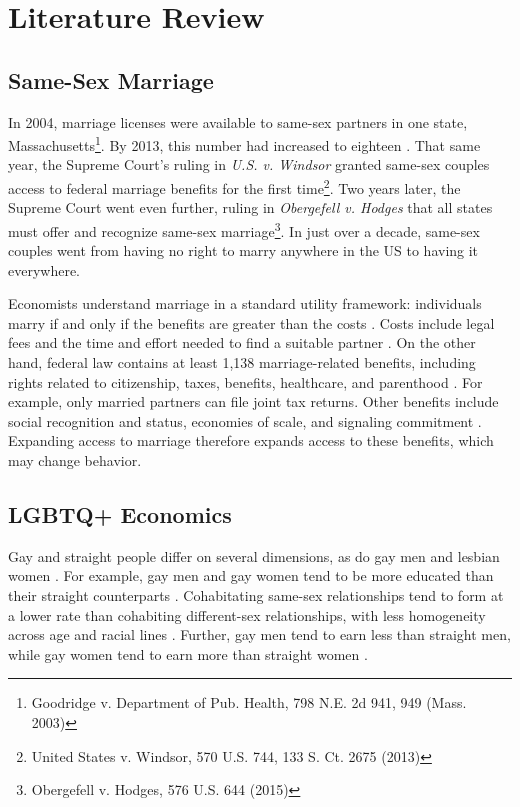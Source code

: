 \documentclass[12pt,letterpaper]{article}
\begin{document}
\section{Literature Review}
\subsection{Same-Sex Marriage}
In 2004, marriage licenses were available to same-sex partners in one state, Massachusetts\footnote{Goodridge v. Department of Pub. Health, 798 N.E. 2d 941, 949 (Mass. 2003)}. By 2013, this number had increased to eighteen \citep{27}. That same year, the Supreme Court's ruling in \textit{U.S. v. Windsor} granted same-sex couples access to federal marriage benefits for the first time\footnote{United States v. Windsor, 570 U.S. 744, 133 S. Ct. 2675 (2013)}. Two years later, the Supreme Court went even further, ruling in \textit{Obergefell v. Hodges} that all states must offer and recognize same-sex marriage\footnote{Obergefell v. Hodges, 576 U.S. 644 (2015)}. In just over a decade, same-sex couples went from having no right to marry anywhere in the US to having it everywhere.

Economists understand marriage in a standard utility framework: individuals marry if and only if the benefits are greater than the costs \citep{9}. Costs include legal fees and the time and effort needed to find a suitable partner \citep{9}. On the other hand, federal law contains at least 1,138 marriage-related benefits, including rights related to citizenship, taxes, benefits, healthcare, and parenthood \citep{1, 8}. For example, only married partners can file joint tax returns. Other benefits include social recognition and status, economies of scale, and signaling commitment \citep{8}. Expanding access to marriage therefore expands access to these benefits, which may change behavior. 

\subsection{LGBTQ+ Economics}

Gay and straight people differ on several dimensions, as do gay men and lesbian women \citep{2, 15}. For example, gay men and gay women tend to be more educated than their straight counterparts \citep{2, 7, 11}. Cohabitating same-sex relationships tend to form at a lower rate than cohabiting different-sex relationships, with less homogeneity across age and racial lines \citep{2, 7}. Further, gay men tend to earn less than straight men, while gay women tend to earn more than straight women \citep{6}.
\end{document}
